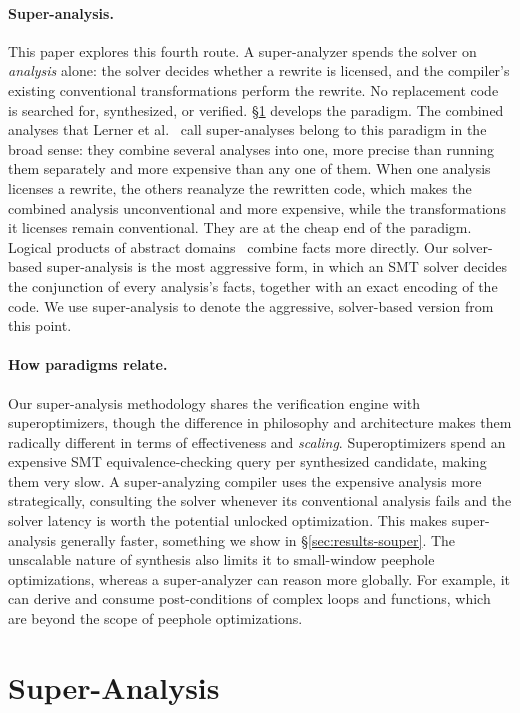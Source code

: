 \documentclass[acmsmall,screen,nonacm]{acmart}
\begin{document}
\paragraph{Super-analysis.} This paper explores this fourth route. A
super-analyzer spends the solver on \emph{analysis} alone: the solver
decides whether a rewrite is licensed, and the compiler's existing conventional
transformations perform the rewrite. No replacement code is searched
for, synthesized, or verified. \S\ref{sec:superanalysis} develops the
paradigm. The combined analyses that Lerner et al.~\cite{lerner2002composing} call super-analyses belong to this paradigm in the broad sense: they combine several analyses into one, more precise than running them separately and more expensive than any one of them. When one analysis licenses a rewrite, the others reanalyze the rewritten code, which makes the combined analysis unconventional and more expensive, while the transformations it licenses remain conventional. They are at the cheap end of the paradigm. Logical products of abstract domains~\cite{gulwani2006combining} combine facts more directly. Our solver-based super-analysis is the most aggressive form, in which an SMT solver decides the conjunction of every analysis's facts, together with an exact encoding of the code. We use super-analysis to denote the aggressive, solver-based version from this point. 

\paragraph{How paradigms relate.} Our super-analysis methodology shares the verification engine with superoptimizers, though the difference in philosophy and architecture makes them radically different in terms of effectiveness and \emph{scaling}. Superoptimizers spend an expensive SMT equivalence-checking query per synthesized candidate, making them very slow. A super-analyzing compiler uses the expensive analysis more strategically, consulting the solver whenever its conventional analysis fails and the solver latency is worth the potential unlocked optimization. This makes super-analysis generally faster, something we show in \S\ref{sec:results-souper}. The unscalable nature of synthesis also limits it to small-window peephole optimizations, whereas a super-analyzer can reason more globally. For example, it can derive and consume post-conditions of complex loops and functions, which are beyond the scope of peephole optimizations.

\section{Super-Analysis}
\label{sec:superanalysis}
\end{document}
